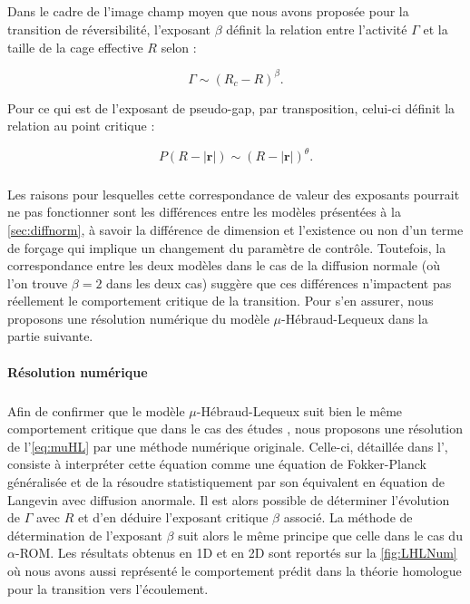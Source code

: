 \subparagraph{}Dans le cadre de l'image champ moyen que nous avons proposée pour la transition de réversibilité, l'exposant $\beta$ définit la relation entre l'activité $\Gamma$ et la taille de la cage effective $R$ selon :

\begin{equation}
	\Gamma \sim (R_c-R)^\beta.
\end{equation}

\noindent Pour ce qui est de l'exposant de pseudo-gap, par transposition, celui-ci définit la relation au point critique :

\begin{equation}
	P(R-|\mathbf{r}|)\sim (R-|\mathbf{r}|)^\theta.
\end{equation}

\subparagraph{}Les raisons pour lesquelles cette correspondance de valeur des exposants pourrait ne pas fonctionner sont les différences entre les modèles présentées à la \autoref{sec:diffnorm}, à savoir la différence de dimension et l'existence ou non d'un terme de forçage qui implique un changement du paramètre de contrôle. Toutefois, la correspondance entre les deux modèles dans le cas de la diffusion normale (où l'on trouve $\beta = 2$ dans les deux cas) suggère que ces différences n'impactent pas réellement le comportement critique de la transition. Pour s'en assurer, nous proposons une résolution numérique du modèle $\mu$-Hébraud-Lequeux dans la partie suivante.

\paragraph{Résolution numérique}

\subparagraph{}Afin de confirmer que le modèle $\mu$-Hébraud-Lequeux suit bien le même comportement critique que dans le cas des études \cite{lin_mean-field_2016, lin_microscopic_2018}, nous proposons une résolution de l'\autoref{eq:muHL} par une méthode numérique originale. Celle-ci, détaillée dans l', consiste à interpréter cette équation comme une équation de Fokker-Planck généralisée et de la résoudre statistiquement par son équivalent en équation de Langevin avec diffusion anormale. Il est alors possible de déterminer l'évolution de $\Gamma$ avec $R$ et d'en déduire l'exposant critique $\beta$ associé. La méthode de détermination de l'exposant $\beta$ suit alors le même principe que celle dans le cas du $\alpha$-ROM. Les résultats obtenus en 1D et en 2D sont reportés sur la \autoref{fig:LHLNum} où nous avons aussi représenté le comportement prédit dans la théorie homologue pour la transition vers l'écoulement.

